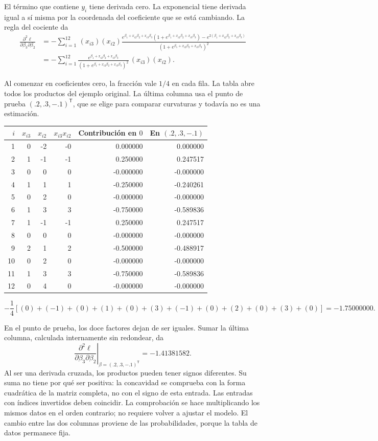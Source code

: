 \documentclass[11pt,a4paper]{article}
\newcommand{\T}{^{\mathsf T}}
\begin{document}
El término que contiene $y_i$ tiene derivada cero.
La exponencial tiene derivada igual a sí misma por la coordenada
del coeficiente que se está cambiando. La regla del cociente da
\[
\begin{aligned}
\frac{\partial^2\ell}{\partial\beta_3\partial\beta_2}&=-\sum_{i=1}^{12}\,(x_{i3})(x_{i2})\frac{e^{\beta_1+x_{i2}\beta_2+x_{i3}\beta_3}(1+e^{\beta_1+x_{i2}\beta_2+x_{i3}\beta_3})-e^{2(\beta_1+x_{i2}\beta_2+x_{i3}\beta_3)}}{(1+e^{\beta_1+x_{i2}\beta_2+x_{i3}\beta_3})^2}\\&=-\sum_{i=1}^{12}\frac{e^{\beta_1+x_{i2}\beta_2+x_{i3}\beta_3}}{(1+e^{\beta_1+x_{i2}\beta_2+x_{i3}\beta_3})^2}\,(x_{i3})(x_{i2}).\end{aligned}
\]

Al comenzar en coeficientes cero, la fracción vale $1/4$ en cada fila.
La tabla abre todos los productos del ejemplo original. La última
columna usa el punto de prueba $(.2,.3,-.1)^\mathsf T$, que se elige
para comparar curvaturas y todavía no es una estimación.
\begin{center}\small
\begin{tabular}{rrrrrr}
\toprule
$i$&$x_{i3}$&$x_{i2}$&$x_{i3}x_{i2}$&Contribución en $0$&En $(.2,.3,-.1)$\\\midrule1&0&-2&-0&0.000000&0.000000\\
2&1&-1&-1&0.250000&0.247517\\
3&0&0&0&-0.000000&-0.000000\\
4&1&1&1&-0.250000&-0.240261\\
5&0&2&0&-0.000000&-0.000000\\
6&1&3&3&-0.750000&-0.589836\\
7&1&-1&-1&0.250000&0.247517\\
8&0&0&0&-0.000000&-0.000000\\
9&2&1&2&-0.500000&-0.488917\\
10&0&2&0&-0.000000&-0.000000\\
11&1&3&3&-0.750000&-0.589836\\
12&0&4&0&-0.000000&-0.000000\\\bottomrule\end{tabular}\end{center}\[
-\frac14\left[(0)+(-1)+(0)+(1)+(0)+(3)+(-1)+(0)+(2)+(0)+(3)+(0)\right]=-1.75000000.
\]

En el punto de prueba, los doce factores dejan de ser iguales.
Sumar la última columna, calculada internamente sin redondear, da
\[
\left.\frac{\partial^2\ell}{\partial\beta_3\partial\beta_2}\right|_{\beta=(.2,.3,-.1)\T}=-1.41381582.
\]
Al ser una derivada cruzada, los productos pueden tener signos diferentes. Su suma no tiene por qué ser positiva: la concavidad se comprueba con la forma cuadrática de la matriz completa, no con el signo de esta entrada.
Las entradas con índices invertidos deben coincidir.
La comprobación se hace multiplicando los mismos datos en el orden
contrario; no requiere volver a ajustar el modelo.
El cambio entre las dos columnas proviene de las probabilidades,
porque la tabla de datos permanece fija.
\end{document}
